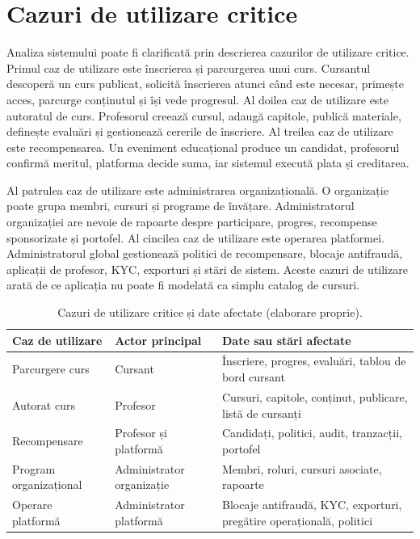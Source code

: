 \section{Cazuri de utilizare critice}
Analiza sistemului poate fi clarificată prin descrierea cazurilor de utilizare critice. Primul caz de utilizare este înscrierea și parcurgerea unui curs. Cursantul descoperă un curs publicat, solicită înscrierea atunci când este necesar, primește acces, parcurge conținutul și își vede progresul. Al doilea caz de utilizare este autoratul de curs. Profesorul creează cursul, adaugă capitole, publică materiale, definește evaluări și gestionează cererile de înscriere. Al treilea caz de utilizare este recompensarea. Un eveniment educațional produce un candidat, profesorul confirmă meritul, platforma decide suma, iar sistemul execută plata și creditarea.

Al patrulea caz de utilizare este administrarea organizațională. O organizație poate grupa membri, cursuri și programe de învățare. Administratorul organizației are nevoie de rapoarte despre participare, progres, recompense sponsorizate și portofel. Al cincilea caz de utilizare este operarea platformei. Administratorul global gestionează politici de recompensare, blocaje antifraudă, aplicații de profesor, KYC, exporturi și stări de sistem. Aceste cazuri de utilizare arată de ce aplicația nu poate fi modelată ca simplu catalog de cursuri.

\begin{table}[H]
    \centering
    \caption{Cazuri de utilizare critice și date afectate (elaborare proprie).}
    \label{tab:use_case_critice}
    \begin{tabular}{P{3.4cm}P{4.8cm}P{5.4cm}}
        \toprule
        Caz de utilizare & Actor principal & Date sau stări afectate \\
        \midrule
        Parcurgere curs & Cursant & Înscriere, progres, evaluări, tablou de bord cursant \\
        Autorat curs & Profesor & Cursuri, capitole, conținut, publicare, listă de cursanți \\
        Recompensare & Profesor și platformă & Candidați, politici, audit, tranzacții, portofel \\
        Program organizațional & Administrator organizație & Membri, roluri, cursuri asociate, rapoarte \\
        Operare platformă & Administrator platformă & Blocaje antifraudă, KYC, exporturi, pregătire operațională, politici \\
        \bottomrule
    \end{tabular}
\end{table}

